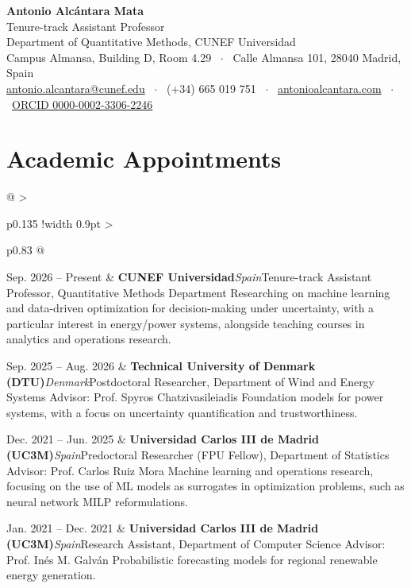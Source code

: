 \documentclass[10pt,a4paper]{article}
\makeatletter
\newenvironment{cvtable}
  {\begin{longtable}{@{} >{\raggedright\arraybackslash\bfseries}p{0.135\textwidth}
                        !{\color{rulegray}\vrule width 0.9pt}
                        >{\raggedright\arraybackslash}p{0.83\textwidth} @{}}}
  {\end{longtable}}
\newcommand{\cventry}[4]{%
  #1 & \textbf{#2}\hfill\textit{\color{mutedtext}#3}\newline #4
  \tabularnewline \noalign{\vskip 5pt}%
}
\makeatother
\begin{document}
\begin{center}
    {\LARGE\bfseries\color{accent} Antonio Alc\'antara Mata}\\[4pt]
    {\normalsize Tenure-track Assistant Professor}\\[3pt]
    {\small
    Department of Quantitative Methods, CUNEF Universidad\\
    Campus Almansa, Building D, Room 4.29 \ $\cdot$ \ Calle Almansa 101, 28040 Madrid, Spain\\[3pt]
    \href{mailto:antonio.alcantara@cunef.edu}{antonio.alcantara@cunef.edu}
    \ $\cdot$ \ (+34) 665 019 751
    \ $\cdot$ \ \href{https://www.antonioalcantara.com/}{antonioalcantara.com}
    \ $\cdot$ \ \href{https://orcid.org/0000-0002-3306-2246}{ORCID 0000-0002-3306-2246}
    }
\end{center}

\vspace{6pt}

\section*{Academic Appointments}
\begin{cvtable}
    \cventry{Sep. 2026 -- Present}
    {CUNEF Universidad}
    {Spain}
    {Tenure-track Assistant Professor, Quantitative Methods Department\newline
    Researching on machine learning and data-driven optimization for decision-making
    under uncertainty, with a particular interest in energy/power systems, alongside
    teaching courses in analytics and operations research.}

    \cventry{Sep. 2025 -- Aug. 2026}
    {Technical University of Denmark (DTU)}
    {Denmark}
    {Postdoctoral Researcher, Department of Wind and Energy Systems\newline
    Advisor: Prof. Spyros Chatzivasileiadis\newline
    Foundation models for power systems, with a focus on uncertainty
    quantification and trustworthiness.}

    \cventry{Dec. 2021 -- Jun. 2025}
    {Universidad Carlos III de Madrid (UC3M)}
    {Spain}
    {Predoctoral Researcher (FPU Fellow), Department of Statistics\newline
    Advisor: Prof. Carlos Ruiz Mora\newline
    Machine learning and operations research, focusing on the use of ML models as
    surrogates in optimization problems, such as neural network MILP reformulations.}

    \cventry{Jan. 2021 -- Dec. 2021}
    {Universidad Carlos III de Madrid (UC3M)}
    {Spain}
    {Research Assistant, Department of Computer Science\newline
    Advisor: Prof. In\'es M. Galv\'an\newline
    Probabilistic forecasting models for regional renewable energy generation.}
\end{cvtable}
\end{document}
